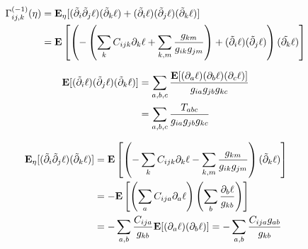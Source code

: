 \documentclass[11pt]{article}
\begin{document}
\begin{align*}
\Gamma^{(-1)}_{ij,k}(\eta) &= \textbf{E}_\eta[(\tilde{\partial}_i\tilde{\partial}_j \ell) (\tilde{\partial}_k \ell) 
+ (\tilde{\partial}_i \ell)(\tilde{\partial}_j \ell)(\tilde{\partial}_k \ell)]
\\&= \textbf{E}\left[\left(-\left(\sum_k C_{ijk} \partial_k \ell  + \sum_{k,m} \frac{g_{km}}{g_{ik}g_{jm}}\right) + (\tilde{\partial}_i \ell)(\tilde{\partial}_j \ell)\right)(\tilde{\partial_k} \ell)\right]
\end{align*}

\begin{align*}
\textbf{E}[(\tilde{\partial}_i \ell)(\tilde{\partial}_j \ell)(\tilde{\partial}_k \ell)] 
&= \sum_{a,b,c} \frac{\textbf{E}[(\partial_a \ell)(\partial_b \ell)(\partial_c \ell)]}{g_{ia}g_{jb}g_{kc}}
\\&= \sum_{a,b,c} \frac{T_{abc}}{g_{ia}g_{jb}g_{kc}}
\end{align*}

\begin{align*}
\textbf{E}_\eta[(\tilde{\partial}_i\tilde{\partial}_j \ell) (\tilde{\partial}_k \ell)]  &= 
\textbf{E}\left[\left(-\sum_k C_{ijk} \partial_k \ell  - \sum_{k,m} \frac{g_{km}}{g_{ik}g_{jm}}\right)(\tilde{\partial}_k \ell)\right]
\\&= - \textbf{E}\left[   \left(\sum_a C_{ija} \partial_a \ell\right) \left(\sum_{b} \frac{\partial_b \ell}{g_{kb}}\right)\right]
\\&= -\sum_{a, b} \frac{C_{ija}}{g_{kb}} \textbf{E}[(\partial_a \ell)(\partial_b \ell)] = -\sum_{a,b} \frac{C_{ija} g_{ab}}{g_{kb}}
\end{align*}
\end{document}
